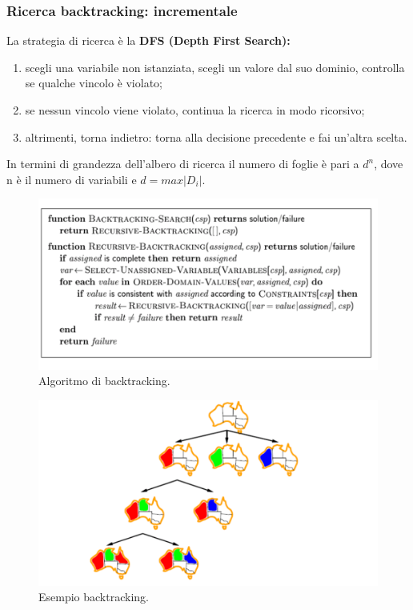 \subsubsection{Ricerca backtracking: incrementale}
La strategia di ricerca è la \textbf{DFS (Depth First Search):}
\begin{enumerate}
    \item scegli una variabile non istanziata, scegli un valore dal suo dominio, controlla se qualche vincolo è violato;
    \item se nessun vincolo viene violato, continua la ricerca in modo ricorsivo;
    \item altrimenti, torna indietro: torna alla decisione precedente e fai un'altra scelta.
\end{enumerate}
In termini di grandezza dell'albero di ricerca il numero di foglie è pari a $d^n$, dove n è il numero di variabili e $d = max|D_i|$.

\begin{figure}[H]
    \centering
    \includegraphics[width=12cm, keepaspectratio]{img/Cap2/dfs.png}
    \caption{Algoritmo di backtracking.}
\end{figure}
\begin{figure}[H]
    \centering
    \includegraphics[width=12cm, keepaspectratio]{img/Cap2/dfs2.png}
    \caption{Esempio backtracking.}
\end{figure}
